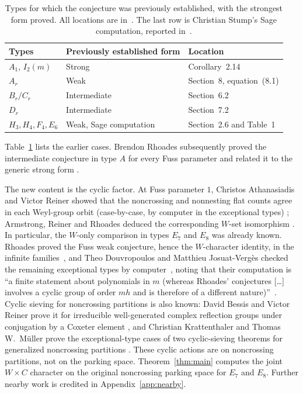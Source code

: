 \documentclass[11pt]{article}
\begin{document}
\begin{table}[ht]
\centering
\caption{Types for which the conjecture was previously established, with
the strongest form proved. All locations are in~\cite{ARR}. The last
row is Christian Stump's Sage computation, reported
in~\cite[Section~2.6, the paragraph after Proposition~2.15, and
Table~1]{ARR}.}
\label{tab:prior}
\begin{tabular}{lll}
\toprule
Types & Previously established form & Location\\
\midrule
$A_1$, $I_2(m)$ & Strong & Corollary~2.14\\
$A_r$ & Weak & Section~8, equation~(8.1)\\
$B_r/C_r$ & Intermediate & Section~6.2\\
$D_r$ & Intermediate & Section~7.2\\
$H_3,H_4,F_4,E_6$ & Weak, Sage computation & Section~2.6 and Table~1\\
\bottomrule
\end{tabular}
\end{table}

Table~\ref{tab:prior} lists the earlier cases. Brendon Rhoades
subsequently proved the intermediate conjecture in type $A$ for every
Fuss parameter and related it to the generic strong form
\cite[Theorems~1.1--1.2 and Table~1]{Rhoades}.

The new content is the cyclic factor. At Fuss parameter $1$, Christos
Athanasiadis and Victor Reiner showed that the noncrossing and
nonnesting flat counts agree in each Weyl-group orbit (case-by-case, by
computer in the exceptional types) \cite[Theorem~6.3]{AR};
Armstrong, Reiner and Rhoades deduced the corresponding $W$-set
isomorphism \cite[Section~2.4, equation~(2.3)]{ARR}. In particular, the
$W$-only comparison in types $E_7$ and $E_8$ was already known. Rhoades
proved the Fuss weak conjecture, hence the $W$-character identity, in
the infinite families~\cite[Table~3]{RhoadesFuss}, and Theo
Douvropoulos and Matthieu Josuat-Verg\`es checked the remaining
exceptional types by computer~\cite[Theorem~3.10 and proof]{DJV}, noting
that their computation is ``a finite statement about polynomials in $m$
(whereas Rhoades' conjectures [\ldots] involves a cyclic group of order
$mh$ and is therefore of a different nature)''~\cite[Section~3.2]{DJV}.
Cyclic sieving for noncrossing partitions is also known: David Bessis
and Victor Reiner prove it for irreducible well-generated complex
reflection groups under conjugation by a Coxeter element
\cite[Theorem~1.1]{BR}, and Christian Krattenthaler and Thomas
W.~M\"uller prove the exceptional-type cases of two cyclic-sieving
theorems for generalized noncrossing partitions
\cite[Theorems~2 and~33]{KM}. These cyclic actions are on noncrossing
partitions, not on the parking space. Theorem~\ref{thm:main} computes
the joint $W\times C$ character on the original noncrossing parking
space for $E_7$ and $E_8$. Further nearby work is credited in
Appendix~\ref{app:nearby}.
\end{document}
